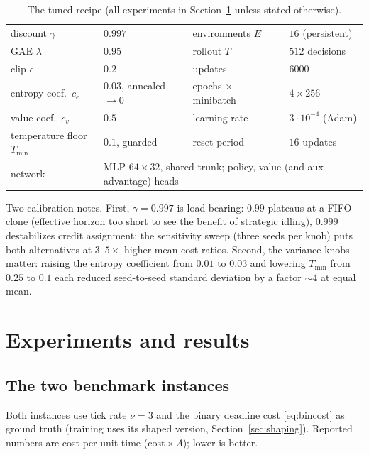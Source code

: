 \documentclass[11pt,a4paper]{article}
\begin{document}
\begin{table}[h]
\centering
\caption{The tuned recipe (all experiments in
Section~\ref{sec:experiments} unless stated otherwise).}
\label{tab:hyper}
\begin{tabular}{llll}
\toprule
discount $\gamma$ & $0.997$ &
environments $E$ & $16$ (persistent) \\
GAE $\lambda$ & $0.95$ &
rollout $T$ & $512$ decisions \\
clip $\epsilon$ & $0.2$ &
updates & $6000$ \\
entropy coef.\ $c_e$ & $0.03$, annealed $\to 0$ &
epochs $\times$ minibatch & $4 \times 256$ \\
value coef.\ $c_v$ & $0.5$ &
learning rate & $3\cdot10^{-4}$ (Adam) \\
temperature floor $T_{\min}$ & $0.1$, guarded &
reset period & $16$ updates \\
network & \multicolumn{3}{l}{MLP $64 \times 32$, shared trunk; policy,
value (and aux-advantage) heads} \\
\bottomrule
\end{tabular}
\end{table}

Two calibration notes.  First, $\gamma = 0.997$ is load-bearing:
$0.99$ plateaus at a FIFO clone (effective horizon too short to see the
benefit of strategic idling), $0.999$ destabilizes credit assignment;
the sensitivity sweep (three seeds per knob) puts both alternatives at
$3$--$5\times$ higher mean cost ratios.  Second, the variance knobs
matter: raising the entropy coefficient from $0.01$ to $0.03$ and
lowering $T_{\min}$ from $0.25$ to $0.1$ each reduced seed-to-seed
standard deviation by a factor ${\sim}4$ at equal mean.

\section{Experiments and results}
\label{sec:experiments}

\subsection{The two benchmark instances}

Both instances use tick rate $\nu = 3$ and the binary deadline cost
\eqref{eq:bincost} as ground truth (training uses its shaped version,
Section~\ref{sec:shaping}).  Reported numbers are cost per unit time
($\mathrm{cost}\times\Lambda$); lower is better.
\end{document}
